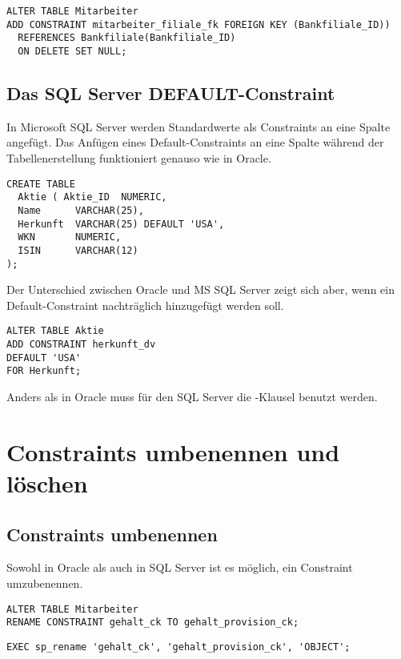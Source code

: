\begin{lstlisting}[language=oracle_sql,caption={Ein Foreign Key-Constraint mit ON DELETE SET NULL-Klausel},label=sql09_18]
ALTER TABLE Mitarbeiter
ADD CONSTRAINT mitarbeiter_filiale_fk FOREIGN KEY (Bankfiliale_ID))
  REFERENCES Bankfiliale(Bankfiliale_ID)
  ON DELETE SET NULL;
        \end{lstlisting}
\subsection{Das SQL Server DEFAULT-Constraint}
In Microsoft SQL Server werden Standardwerte als Constraints an eine
Spalte angefügt. Das Anfügen eines Default-Constraints an eine Spalte
während der Tabellenerstellung funktioniert genauso wie in Oracle.
\begin{lstlisting}[language=ms_sql,caption={Erstellen
          einer Tabelle mit einem Standardwert},label=sql09_18a]
CREATE TABLE
  Aktie ( Aktie_ID  NUMERIC,
  Name      VARCHAR(25),
  Herkunft  VARCHAR(25) DEFAULT 'USA',
  WKN       NUMERIC,
  ISIN      VARCHAR(12)
);
          \end{lstlisting}
Der Unterschied zwischen Oracle und MS SQL Server zeigt sich aber, wenn ein Default-Constraint nachträglich hinzugefügt werden soll.
\begin{lstlisting}[language=ms_sql,caption={Tabellenspalte mit
          Standardwert hinzufügen in SQL Server},label=sql09_18b] 
ALTER TABLE Aktie
ADD CONSTRAINT herkunft_dv
DEFAULT 'USA'
FOR Herkunft;
          \end{lstlisting}
Anders als in Oracle muss für den SQL Server die -Klausel benutzt werden.
\section{Constraints umbenennen und löschen}
\subsection{Constraints umbenennen}
Sowohl in Oracle als auch in SQL Server ist es möglich, ein Constraint umzubenennen.
\begin{lstlisting}[language=oracle_sql,caption={Ein Constraint umbenennen in Oracle},label=sql09_19]
ALTER TABLE Mitarbeiter
RENAME CONSTRAINT gehalt_ck TO gehalt_provision_ck;
        \end{lstlisting}
\begin{lstlisting}[language=ms_sql,caption={Ein Constraint umbenennen in SQL Server},label=sql09_20,emphstyle={[9]\color{red}},emph={[9]sp_rename}]
EXEC sp_rename 'gehalt_ck', 'gehalt_provision_ck', 'OBJECT';
        \end{lstlisting}
